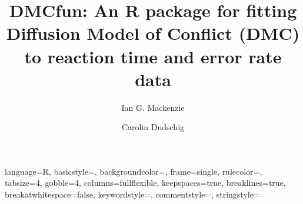 \newenvironment{knitrout}{}{} %

\usepackage{alltt}  %

\usepackage{times}  %
\usepackage{graphicx}
\usepackage{color}
\usepackage{float}
\usepackage{amsmath}
\usepackage{listings}
\usepackage{longtable}
\usepackage[style=apa, sortcites=true, sorting=nyt,backend=biber]{biblatex}





{
  language=R,
  basicstyle=\small\ttfamily,
  backgroundcolor=\color{white},
  frame=single,
  rulecolor=\color{black},
  tabsize=4,
  gobble=4,
  columns=fullflexible,
  keepspaces=true,
  breaklines=true,
  breakatwhitespace=false,
  keywordstyle=\color{black},
  commentstyle=\color{dkgreen},
  stringstyle=\color{black}
}


\setlength{\parskip}{12pt}
\setlength\parindent{0pt}

\title{DMCfun: An R package for fitting Diffusion Model of Conflict (DMC) to reaction time and error rate data}
\subtitle{}

\author{
    Ian G. Mackenzie \and
    Carolin Dudschig
}


